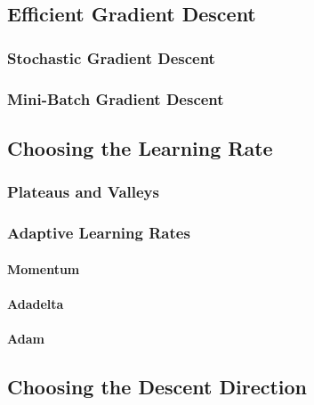 		\subsection{Efficient Gradient Descent} %

			\subsubsection{Stochastic Gradient Descent} %
				\label{subsubsec:sgd}


			\subsubsection{Mini-Batch Gradient Descent} %

		\subsection{Choosing the Learning Rate} %

			\subsubsection{Plateaus and Valleys} %

			\subsubsection{Adaptive Learning Rates} %

				\paragraph{Momentum} %

				\paragraph{Adadelta} %

				\paragraph{Adam} %

		\subsection{Choosing the Descent Direction} %

